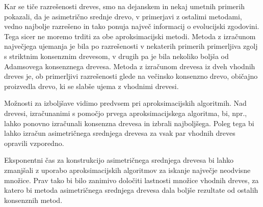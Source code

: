 \documentclass[a4paper, 12pt]{book}
\begin{document}
Kar se tiče razrešenosti dreves, smo na dejanskem in nekaj umetnih primerih pokazali, da 
je asimetrično srednje drevo, v primerjavi z ostalimi metodami, vedno najbolje razrešeno in tako ponuja največ 
informacij o evolucijski zgodovini. 
Tega sicer ne moremo trditi za obe aproksimacijski metodi. Metoda z izračunom 
največjega ujemanja je bila po razrešenosti v nekaterih primerih primerljiva zgolj 
s striktnim konsenznim drevesom, v drugih pa je bila nekoliko boljša od Adamsovega 
konsenznega drevesa. Metoda z izračunom drevesa iz dveh vhodnih dreves je, ob 
primerljivi razrešenosti glede na večinsko konsenzno drevo, običajno proizvedla drevo,
ki se slabše ujema z vhodnimi drevesi. 

Možnosti za izboljšave vidimo predvsem pri aproksimacijskih algoritmih. Nad drevesi,
izračunanimi s pomočjo prvega aproksimacijskega algoritma, bi, npr., lahko ponovno 
izračunali konsenzna drevesa in izbrali najboljšega. Poleg tega bi lahko
izračun asimetričnega srednjega drevesa za vsak par vhodnih dreves opravili vzporedno. 

Eksponentni čas za konstrukcijo asimetričnega srednjega drevesa bi lahko zmanjšali z 
uporabo aproksimacijskih algoritmov za iskanje največje neodvisne množice.
Prav tako bi bilo zanimivo določiti lastnosti množice vhodnih dreves, za katero bi 
metoda asimetričnega srednjega drevesa dala boljše rezultate od ostalih konsenznih metod.
\end{document}
